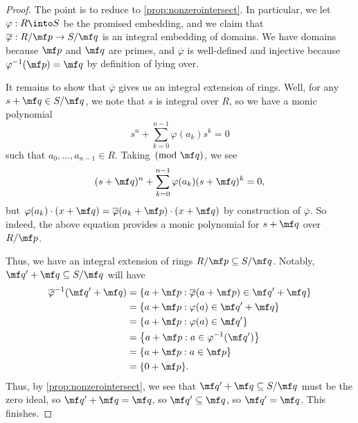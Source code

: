 \begin{proof}
	The point is to reduce to \autoref{prop:nonzerointersect}. In particular, we let $\varphi:R\into S$ be the promised embedding, and we claim that $\overline\varphi:R/\mf p\to S/\mf q$ is an integral embedding of domains. We have domains because $\mf p$ and $\mf q$ are primes, and $\overline\varphi$ is well-defined and injective because $\varphi^{-1}(\mf p)=\mf q$ by definition of lying over.

	It remains to show that $\overline\varphi$ gives us an integral extension of rings. Well, for any $s+\mf q\in S/\mf q$, we note that $s$ is integral over $R$, so we have a monic polynomial
	\[s^n+\sum_{k=0}^{n-1}\varphi(a_k)s^k=0\]
	such that $a_0,\ldots,a_{n-1}\in R$. Taking$\pmod{\mf q}$, we see
	\[(s+\mf q)^n+\sum_{k=0}^{n-1}\varphi(a_k)(s+\mf q)^k=0,\]
	but $\varphi(a_k)\cdot(x+\mf q)=\overline\varphi(a_k+\mf p)\cdot(x+\mf q)$ by construction of $\overline\varphi$. So indeed, the above equation provides a monic polynomial for $s+\mf q$ over $R/\mf p$.

	Thus, we have an integral extension of rings $R/\mf p\subseteq S/\mf q$. Notably, $\mf q'+\mf q\subseteq S/\mf q$ will have
	\begin{align*}
		\overline\varphi^{-1}(\mf q'+\mf q) &= \{a+\mf p:\overline\varphi(a+\mf p)\in\mf q'+\mf q\} \\
		&= \{a+\mf p:\varphi(a)\in\mf q'+\mf q\} \\
		&= \{a+\mf p:\varphi(a)\in\mf q'\} \\
		&= \left\{a+\mf p:a\in\varphi^{-1}(\mf q')\right\} \\
		&= \left\{a+\mf p:a\in\mf p\right\} \\
		&= \{0+\mf p\}.
	\end{align*}
	Thus, by \autoref{prop:nonzerointersect}, we see that $\mf q'+\mf q\subseteq S/\mf q$ must be the zero ideal, so $\mf q'+\mf q=\mf q$, so $\mf q'\subseteq\mf q$, so $\mf q'=\mf q$. This finishes.
\end{proof}